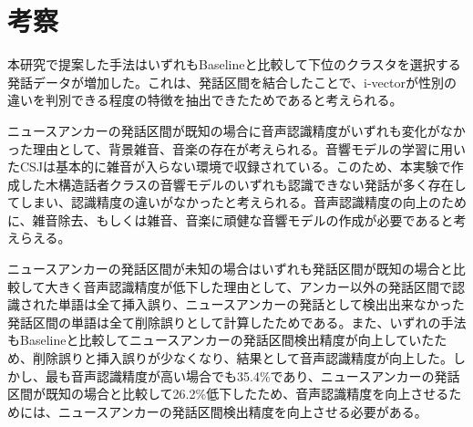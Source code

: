 \section{考察}
本研究で提案した手法はいずれもBaselineと比較して下位のクラスタを選択する発話データが増加した。これは、発話区間を結合したことで、i-vectorが性別の違いを判別できる程度の特徴を抽出できたためであると考えられる。\par
ニュースアンカーの発話区間が既知の場合に音声認識精度がいずれも変化がなかった理由として、背景雑音、音楽の存在が考えられる。音響モデルの学習に用いたCSJは基本的に雑音が入らない環境で収録されている。このため、本実験で作成した木構造話者クラスの音響モデルのいずれも認識できない発話が多く存在してしまい、認識精度の違いがなかったと考えられる。音声認識精度の向上のために、雑音除去、もしくは雑音、音楽に頑健な音響モデルの作成が必要であると考えらえる。\par
ニュースアンカーの発話区間が未知の場合はいずれも発話区間が既知の場合と比較して大きく音声認識精度が低下した理由として、アンカー以外の発話区間で認識された単語は全て挿入誤り、ニュースアンカーの発話として検出出来なかった発話区間の単語は全て削除誤りとして計算したためである。また、いずれの手法もBaselineと比較してニュースアンカーの発話区間検出精度が向上していたため、削除誤りと挿入誤りが少なくなり、結果として音声認識精度が向上した。しかし、最も音声認識精度が高い場合でも35.4\%であり、ニュースアンカーの発話区間が既知の場合と比較して26.2\%低下したため、音声認識精度を向上させるためには、ニュースアンカーの発話区間検出精度を向上させる必要がある。
